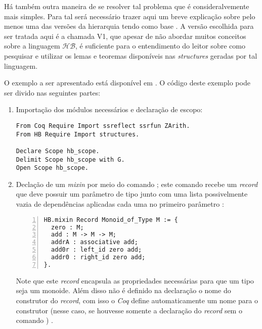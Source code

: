 {{Há também outra maneira de se resolver tal problema que é consideralvemente mais simples. Para tal será necessário trazer aqui um breve explicação sobre pelo menos uma das versões da hierarquia tendo como base \cite{cohen:hal-02478907}. A versão escolhida para ser tratada aqui é a chamada V1, que apesar de não abordar muitos conceitos sobre a linguagem $\mathcal{HB}$, é suficiente para o entendimento do leitor sobre como pesquisar e utilizar os lemas e teoremas disponíveis nas \textit{structures} geradas por tal linguagem.

O exemplo a ser apresentado está disponível em \cite{mathcomp-hb-v1}. O código deste exemplo pode ser divido nas seguintes partes:
    \begin{enumerate}
        \item Importação dos módulos necessários e declaração de escopo:
        \begin{lstlisting}[language=coq, frame=single, tabsize=1]
From Coq Require Import ssreflect ssrfun ZArith.
From HB Require Import structures.

Declare Scope hb_scope.
Delimit Scope hb_scope with G.
Open Scope hb_scope.
        \end{lstlisting}
    
        \item \label{item:mixin-monoid} Declação de um \textit{mixin} por meio do comando ; este comando recebe um \textit{record} que deve possuir um parâmetro de tipo  junto com uma lista possivelmente vazia de dependências 
        aplicadas cada uma no primeiro parâmetro \cite{cohen:hal-02478907}:
            \begin{lstlisting}[language=coq, frame=single, tabsize=1, numbers=left]
HB.mixin Record Monoid_of_Type M := {
  zero : M;
  add : M -> M -> M;
  addrA : associative add;
  add0r : left_id zero add;
  addr0 : right_id zero add;
}.
            \end{lstlisting}
        Note que este \textit{record} encapsula as propriedades necessárias para que um tipo  seja um monoide. Além disso não é definido na declaração o nome do construtor do \textit{record}, com isso o \textit{Coq} define automaticamente um nome para o construtor (nesse caso, se houvesse somente a declaração do \textit{record} sem o comando  ) \cite{cohen:hal-02478907}.


\end{enumerate}}}
